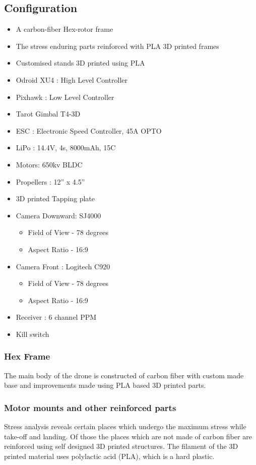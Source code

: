 \documentclass[12pt]{article}
\begin{document}
\subsection{Configuration}
\begin{itemize}
	\item A carbon-fiber Hex-rotor frame
	\item The stress enduring parts reinforced with PLA 3D printed frames
	\item Customised stands 3D printed using PLA
    \item Odroid XU4 : High Level Controller
    \item Pixhawk : Low Level Controller
    \item Tarot Gimbal T4-3D
    \item ESC     : Electronic Speed Controller, 45A OPTO
    \item LiPo : 14.4V, 4s, 8000mAh, 15C
    \item Motors: 650kv BLDC
    \item Propellers : 12” x 4.5”
    \item 3D printed Tapping plate
    \item Camera Downward: SJ4000
    \begin{itemize}
    	\item Field of View - 78 degrees
    	\item Aspect Ratio - 16:9
    \end{itemize}
    \item Camera Front : Logitech C920
    \begin{itemize}
    	\item Field of View - 78 degrees
    	\item Aspect Ratio - 16:9
    \end{itemize}	
    \item Receiver : 6 channel PPM
    \item Kill switch 
\end{itemize}

	\subsubsection{Hex Frame}
	The main body of the drone is constructed of carbon fiber with custom made base and improvements made using PLA based 3D printed parts. 
	\subsubsection{Motor mounts and other reinforced parts}
	Stress analysis reveals certain places which undergo the maximum stress while take-off and landing. Of those the places which are not made of carbon fiber are reinforced using self designed 3D printed structures. The filament of the 3D printed material uses polylactic acid (PLA), which is a hard plastic.
\end{document}
